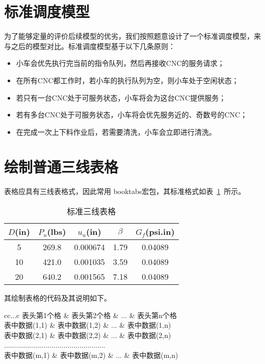 \documentclass{cumcmthesis}
\begin{document}
\section{标准调度模型}
为了能够定量的评价后续模型的优劣，我们按照题意设计了一个标准调度模型，来与之后的模型对比。标准调度模型基于以下几条原则：
\begin{itemize}
    \item 小车会优先执行完当前的指令队列，然后再接收CNC的服务请求；
    \item 在所有CNC都工作时，若小车的执行队列为空，则小车处于空闲状态；
    \item 若只有一台CNC处于可服务状态，小车将会为这台CNC提供服务；
    \item 若有多台CNC处于可服务状态，小车将会优先服务近的、奇数号的CNC；
    \item 在完成一次上下料作业后，若需要清洗，小车会立即进行清洗。
\end{itemize}


\section{绘制普通三线表格}
表格应具有三线表格式，因此常用 booktabs宏包，其标准格式如表~\ref{tab001}~所示。
\begin{table}[!htbp]
\caption{标准三线表格}\label{tab001} \centering
\begin{tabular}{ccccc}
\toprule[1.5pt]
$D$(in) & $P_u$(lbs) & $u_u$(in) & $\beta$ & $G_f$(psi.in)\\
\midrule[1pt]
 5 & 269.8 & 0.000674 & 1.79 & 0.04089\\
10 & 421.0 & 0.001035 & 3.59 & 0.04089\\
20 & 640.2 & 0.001565 & 7.18 & 0.04089\\
\bottomrule[1.5pt]
\end{tabular}
\end{table}

其绘制表格的代码及其说明如下。
\begin{tcode}
\begin{table}[!htbp]
\caption[标签名]{中文标题}
\begin{tabular}{cc...c}
\toprule[1.5pt]
表头第1个格   & 表头第2个格   & ... & 表头第n个格  \\
\midrule[1pt]
表中数据(1,1) & 表中数据(1,2) & ... & 表中数据(1,n)\\
表中数据(2,1) & 表中数据(2,2) & ... & 表中数据(2,n)\\
...................................................\\
表中数据(m,1) & 表中数据(m,2) & ... & 表中数据(m,n)\\
\bottomrule[1.5pt]
\end{tabular}
\end{table}
\end{tcode}
\end{document}
